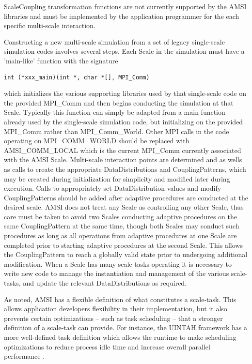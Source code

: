 \documentclass[11pt]{article}
\begin{document}
ScaleCoupling transformation functions are not currently supported by the AMSI libraries and must be implemented by the application programmer for the each specific multi-scale interaction.

Constructing a new multi-scale simulation from a set of legacy single-scale simulation codes involves several steps.
Each Scale in the simulation must have a 'main-like' function with the signature
\begin{verbatim}
int (*xxx_main)(int *, char *[], MPI_Comm)
\end{verbatim}
which initializes the various supporting libraries used by that single-scale code on the provided MPI\_Comm and then begins conducting the simulation at that Scale.
Typically this function can simply be adapted from a main function already used by the single-scale simulation code, but initializing on the provided MPI\_Comm rather than MPI\_Comm\_World.
Other MPI calls in the code operating on MPI\_COMM\_WORLD should be replaced with AMSI\_COMM\_LOCAL which is the current MPI\_Comm currently associated with the AMSI Scale.
Multi-scale interaction points are determined and as wells as calls to create the appropriate DataDistributions and CouplingPatterns, which may be created during initialization for simplicity and modified later during execution.
Calls to appropriately set DataDistribution values and modify CouplingPatterns should be added after adaptive procedures are conducted at the desired scale.
AMSI does not treat any Scale as controlling any other Scale, thus care must be taken to avoid two Scales conducting adaptive procedures on the same CouplingPattern at the same time, though both Scales may conduct such procedures as long as all operations from adaptive procedures at one Scale are completed prior to starting adaptive procedures at the second Scale.
This allows the CouplingPattern to reach a globally valid state prior to undergoing additional modification.
When a Scale has many scale-tasks operating it is necessary to write new code to manage the instantiation and management of the various scale-tasks, and update the relevant DataDistributions as required.

As noted, AMSI has a flexible definition of what constitutes a scale-task.
This allows application developers flexibility in their implementation, but it also prevents certain optimizations -- such as task scheduling -- that a stronger definition of a scale-task can provide.
For instance, the UINTAH framework \cite{davison200uintah} has a more well-defined task definition which allows the runtime to make scheduling optimizations to reduce process idle time and increase overall parallel performance \cite{meng2010dynamic}.
\end{document}

